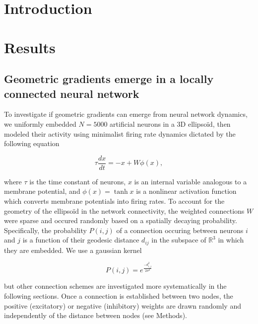 \documentclass{article}
\begin{document}
\begin{multicols}{2}

\section*{Introduction}



\section*{Results}


\subsection*{Geometric gradients emerge in a locally connected neural network}

To investigate if geometric gradients can emerge from neural network dynamics, we uniformly embedded $N=5000$ artificial neurons in a 3D ellipsoïd, then modeled their activity using minimalist firing rate dynamics dictated by the following equation

$$\tau\frac{dx}{dt} = -x+W\phi (x),$$

where $\tau$ is the time constant of neurons, $x$ is an internal variable analogous to a membrane potential, and $\phi(x)=\tanh{x}$ is a nonlinear activation function which converts membrane potentials into firing rates. To account for the geometry of the ellipsoïd in the network connectivity, the weighted connections $W$ were sparse and occured randomly based on a spatially decaying probability. Specifically, the probability $P(i, j)$ of a connection occuring between neurons $i$ and $j$ is a function of their geodesic distance $d_{ij}$ in the subspace of $\mathbb{R}^3$ in which they are embedded. We use a gaussian kernel

$$P(i,j)=e^{\frac{-d_{i,j}^2}{2\sigma^2}}$$

but other connection schemes are investigated more systematically in the following sections. Once a connection is established between two nodes, the positive (excitatory) or negative (inhibitory) weights are drawn randomly and independently of the distance between nodes (see Methods). 


\end{multicols}
\end{document}
